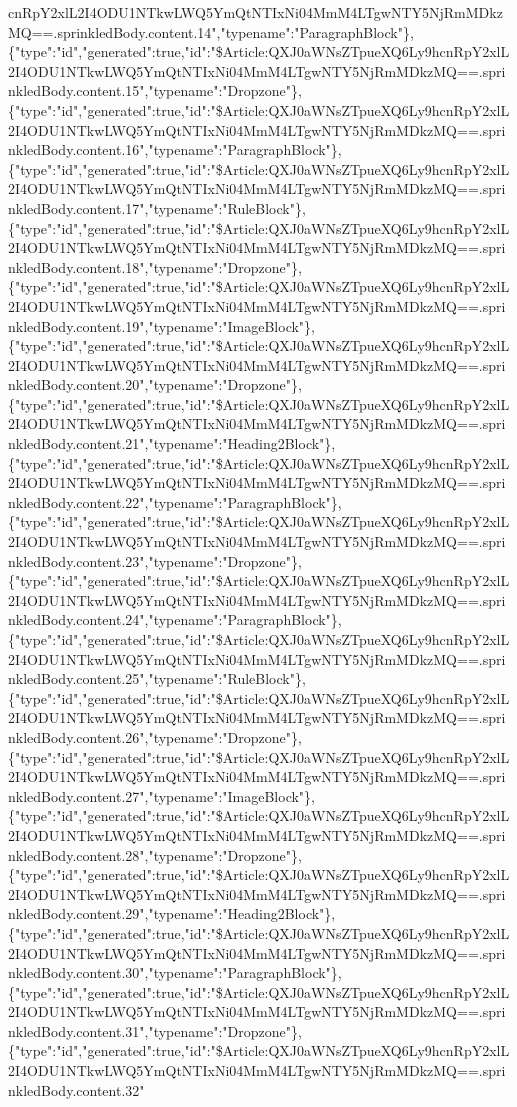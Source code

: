 cnRpY2xlL2I4ODU1NTkwLWQ5YmQtNTIxNi04MmM4LTgwNTY5NjRmMDkzMQ==.sprinkledBody.content.14","typename":"ParagraphBlock"\},\{"type":"id","generated":true,"id":"\$Article:QXJ0aWNsZTpueXQ6Ly9hcnRpY2xlL2I4ODU1NTkwLWQ5YmQtNTIxNi04MmM4LTgwNTY5NjRmMDkzMQ==.sprinkledBody.content.15","typename":"Dropzone"\},\{"type":"id","generated":true,"id":"\$Article:QXJ0aWNsZTpueXQ6Ly9hcnRpY2xlL2I4ODU1NTkwLWQ5YmQtNTIxNi04MmM4LTgwNTY5NjRmMDkzMQ==.sprinkledBody.content.16","typename":"ParagraphBlock"\},\{"type":"id","generated":true,"id":"\$Article:QXJ0aWNsZTpueXQ6Ly9hcnRpY2xlL2I4ODU1NTkwLWQ5YmQtNTIxNi04MmM4LTgwNTY5NjRmMDkzMQ==.sprinkledBody.content.17","typename":"RuleBlock"\},\{"type":"id","generated":true,"id":"\$Article:QXJ0aWNsZTpueXQ6Ly9hcnRpY2xlL2I4ODU1NTkwLWQ5YmQtNTIxNi04MmM4LTgwNTY5NjRmMDkzMQ==.sprinkledBody.content.18","typename":"Dropzone"\},\{"type":"id","generated":true,"id":"\$Article:QXJ0aWNsZTpueXQ6Ly9hcnRpY2xlL2I4ODU1NTkwLWQ5YmQtNTIxNi04MmM4LTgwNTY5NjRmMDkzMQ==.sprinkledBody.content.19","typename":"ImageBlock"\},\{"type":"id","generated":true,"id":"\$Article:QXJ0aWNsZTpueXQ6Ly9hcnRpY2xlL2I4ODU1NTkwLWQ5YmQtNTIxNi04MmM4LTgwNTY5NjRmMDkzMQ==.sprinkledBody.content.20","typename":"Dropzone"\},\{"type":"id","generated":true,"id":"\$Article:QXJ0aWNsZTpueXQ6Ly9hcnRpY2xlL2I4ODU1NTkwLWQ5YmQtNTIxNi04MmM4LTgwNTY5NjRmMDkzMQ==.sprinkledBody.content.21","typename":"Heading2Block"\},\{"type":"id","generated":true,"id":"\$Article:QXJ0aWNsZTpueXQ6Ly9hcnRpY2xlL2I4ODU1NTkwLWQ5YmQtNTIxNi04MmM4LTgwNTY5NjRmMDkzMQ==.sprinkledBody.content.22","typename":"ParagraphBlock"\},\{"type":"id","generated":true,"id":"\$Article:QXJ0aWNsZTpueXQ6Ly9hcnRpY2xlL2I4ODU1NTkwLWQ5YmQtNTIxNi04MmM4LTgwNTY5NjRmMDkzMQ==.sprinkledBody.content.23","typename":"Dropzone"\},\{"type":"id","generated":true,"id":"\$Article:QXJ0aWNsZTpueXQ6Ly9hcnRpY2xlL2I4ODU1NTkwLWQ5YmQtNTIxNi04MmM4LTgwNTY5NjRmMDkzMQ==.sprinkledBody.content.24","typename":"ParagraphBlock"\},\{"type":"id","generated":true,"id":"\$Article:QXJ0aWNsZTpueXQ6Ly9hcnRpY2xlL2I4ODU1NTkwLWQ5YmQtNTIxNi04MmM4LTgwNTY5NjRmMDkzMQ==.sprinkledBody.content.25","typename":"RuleBlock"\},\{"type":"id","generated":true,"id":"\$Article:QXJ0aWNsZTpueXQ6Ly9hcnRpY2xlL2I4ODU1NTkwLWQ5YmQtNTIxNi04MmM4LTgwNTY5NjRmMDkzMQ==.sprinkledBody.content.26","typename":"Dropzone"\},\{"type":"id","generated":true,"id":"\$Article:QXJ0aWNsZTpueXQ6Ly9hcnRpY2xlL2I4ODU1NTkwLWQ5YmQtNTIxNi04MmM4LTgwNTY5NjRmMDkzMQ==.sprinkledBody.content.27","typename":"ImageBlock"\},\{"type":"id","generated":true,"id":"\$Article:QXJ0aWNsZTpueXQ6Ly9hcnRpY2xlL2I4ODU1NTkwLWQ5YmQtNTIxNi04MmM4LTgwNTY5NjRmMDkzMQ==.sprinkledBody.content.28","typename":"Dropzone"\},\{"type":"id","generated":true,"id":"\$Article:QXJ0aWNsZTpueXQ6Ly9hcnRpY2xlL2I4ODU1NTkwLWQ5YmQtNTIxNi04MmM4LTgwNTY5NjRmMDkzMQ==.sprinkledBody.content.29","typename":"Heading2Block"\},\{"type":"id","generated":true,"id":"\$Article:QXJ0aWNsZTpueXQ6Ly9hcnRpY2xlL2I4ODU1NTkwLWQ5YmQtNTIxNi04MmM4LTgwNTY5NjRmMDkzMQ==.sprinkledBody.content.30","typename":"ParagraphBlock"\},\{"type":"id","generated":true,"id":"\$Article:QXJ0aWNsZTpueXQ6Ly9hcnRpY2xlL2I4ODU1NTkwLWQ5YmQtNTIxNi04MmM4LTgwNTY5NjRmMDkzMQ==.sprinkledBody.content.31","typename":"Dropzone"\},\{"type":"id","generated":true,"id":"\$Article:QXJ0aWNsZTpueXQ6Ly9hcnRpY2xlL2I4ODU1NTkwLWQ5YmQtNTIxNi04MmM4LTgwNTY5NjRmMDkzMQ==.sprinkledBody.content.32"